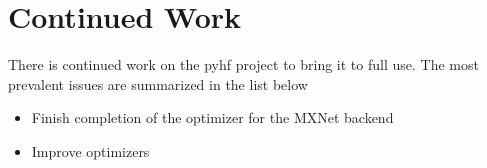 \section{Continued Work}\label{section:continued_work}

There is continued work on the pyhf project to bring it to full use.
The most prevalent issues are summarized in the list below

\begin{itemize}
 \item Finish completion of the optimizer for the MXNet backend
 \item Improve optimizers
\end{itemize}
